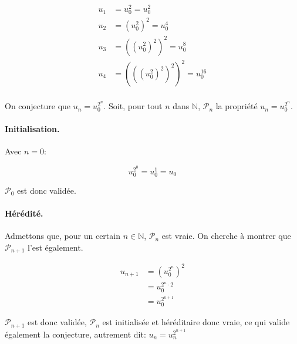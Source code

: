 \documentclass{article}
\newcommand{\N}{\mathds{N}}
\newcommand{\qed}{\square}
\newcommand{\spliteq}[1]{\begin{equation*}\begin{split}#1\end{split}\end{equation*}}
\begin{document}
\section{}

\spliteq{
	u_1 &= u_0^2 = u_0^2\\
	u_2 &= (u_0^2)^2 = u_0^4 \\
	u_3 &= ((u_0^2)^2)^2 = u_0^8\\
	u_4 &= (((u_0^2)^2)^2)^2 = u_0^{16} \\
}

On conjecture que $u_n = u_0^{2^n}$.
Soit, pour tout $n$ dans $\N$, $\mathcal{P}_n$ la propriété $u_n = u_0^{2^n}$.

\paragraph{Initialisation.} Avec $n=0$:

\[
	u_0^{2^0} = u_0^1 = u_0
\]

$\mathcal{P}_0$ est donc validée.


\paragraph{Hérédité.} Admettons que, pour un certain $n \in \N$, $\mathcal{P}_{n}$ est vraie. On cherche à montrer que $\mathcal{P}_{n+1}$ l'est également.

\spliteq{
	u_{n+1} &= (u_0^{2^n})^2 \\
		&= u_0^{2^n\cdot2} \\
		&= u_0^{2^{n+1}}
}

$\mathcal{P}_{n+1}$ est donc validée, $\mathcal{P}_{n}$ est initialisée et héréditaire donc vraie, ce qui valide également la conjecture, autrement dit: $u_n = u_n^{2^{n+1}}$ \qed
\end{document}

